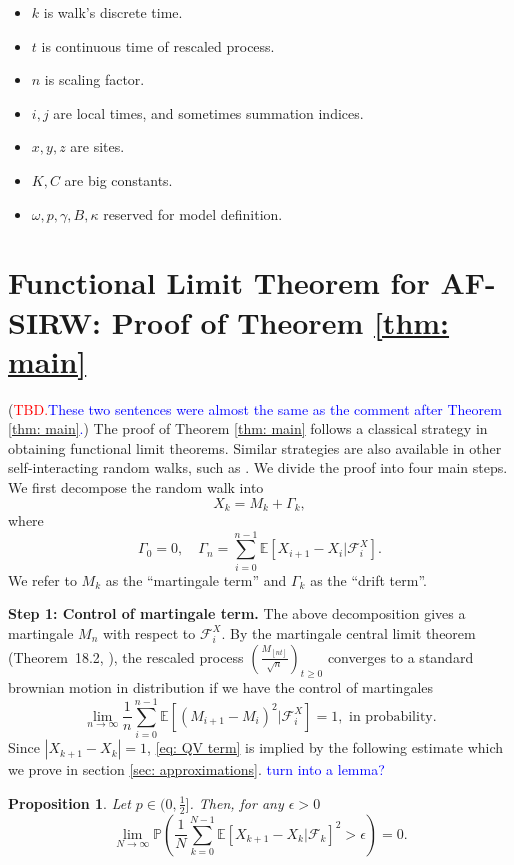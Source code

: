 \documentclass[twoside,12pt,a4paper]{article}
\newtheorem{proposition}{Proposition}[section]
\numberwithin{equation}{section}
\newcommand{\abs}[1]{\left\vert #1 \right\vert}
\newcommand\TBD{\textcolor{red}{TBD.}}
\newcommand{\comment}[1]{\textcolor{blue}{#1}}
\begin{document}
	\begin{itemize}
		\item $k$ is walk's discrete time.
		\item $t$ is continuous time of rescaled process.
		\item $n$ is scaling factor.
		\item $i, j$ are local times, and sometimes summation indices.
		\item $x, y, z$ are sites.
		\item $K, C$ are big constants.
		\item $\omega, p, \gamma, B, \kappa$ reserved for model definition.
	\end{itemize}
	
	
	\section{Functional Limit Theorem for AF-SIRW: Proof of Theorem \ref{thm: main}}
	\label{sec: proof of main}

	(\TBD \textcolor{blue}{These two sentences were almost the same as the comment after Theorem \ref{thm: main}.})
	The proof of Theorem \ref{thm: main} follows a classical strategy in obtaining functional limit theorems. Similar strategies are also available in other self-interacting random walks, such as \cite{KP16,KMP22}.
	 We divide the proof into four main steps. We first decompose the random walk into
	\begin{equation}
		\label{eqn:decomposition}
	X_k = M_k+ \Gamma_k, 
\end{equation}
	where
	\[ 
	\Gamma_0 = 0, \quad \Gamma_n = \sum_{i=0}^{n-1} \mathbb{E}\left[ X_{i+1}-X_i | \mathcal{F}_i^X 
	\right].
	\] 
	We refer to $M_k$ as the ``martingale term'' and $\Gamma_k$ as the ``drift term''.
	
	\textbf{Step 1: Control of martingale term.}
	The above decomposition gives a martingale $M_n$ with respect to $\mathcal{F}_i^X.$ By the martingale central limit theorem (Theorem~18.2, \cite{B99}), the rescaled process $\left( \frac{M_{\left\lfloor n t \right\rfloor}}{\sqrt{n}} \right) _{t \ge 0}$ converges to a standard brownian motion in distribution if we have the control of martingales 
	\begin{equation}\label{eq: QV term}
		\lim_{n\to \infty}\frac{1}{n} \sum_{i=0}^{n-1}\mathbb{E}\left[ (M_{i+1}- M_{i})^2 |\mathcal{F}_i^X \right] =1,  \mbox{ in probability}.
	\end{equation}
	Since $\abs{X_{k+1}-X_k}=1$,  \eqref{eq: QV term} is implied by the following estimate which we prove in section \ref{sec: approximations}. 
	\comment{turn into a lemma?}
	\begin{proposition} \label{lm: control of martingale} 
		Let $p\in (0,\frac{1}{2}]$. Then, for any $\epsilon >0$
		\begin{equation}\label{eq:  term}
			\lim_{N \to \infty }\mathbb{P}\left(\frac{1}{N} \sum_{k = 0}^{N-1} \mathbb{E}\left[ X_{k+1} - X_k | \mathcal{F}_k \right]^2 > \epsilon \right) =0. 
		\end{equation}
	\end{proposition}
	\vspace{2em}
	
\end{document}
